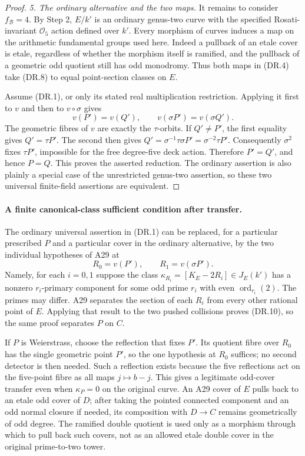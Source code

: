 \documentclass[11pt,a4paper]{article}
\begin{document}
\begin{proof}
\emph{5. The ordinary alternative and the two maps.}
It remains to consider $f_{\mathcal B}=4$.  By Step 2, $E/k'$ is an
ordinary genus-two curve with the specified Rosati-invariant
$\mathcal O_5$ action defined over $k'$.  Every morphism of curves induces a map on
the arithmetic fundamental groups used here.  Indeed a pullback of
an etale cover is etale, regardless of whether the morphism itself is
ramified, and the pullback of a geometric odd quotient still has odd
monodromy.  Thus both maps in (DR.4) take (DR.8) to equal point-section
classes on $E$.

Assume (DR.1), or only its stated real multiplication restriction.
Applying it first to $v$ and then to $v\circ\sigma$
gives
\[
                 v(P')=v(Q'),\qquad
                 v(\sigma P')=v(\sigma Q').
 \tag{DR.10}
\]
The geometric fibres of $v$ are exactly the $\tau$-orbits.  If
$Q'\ne P'$, the first equality gives $Q'=\tau P'$.  The second then
gives $Q'=\sigma^{-1}\tau\sigma P'=\sigma^{-2}\tau P'$.
Consequently $\sigma^2$ fixes $\tau P'$, impossible for the free
degree-five deck action.  Therefore $P'=Q'$, and hence $P=Q$.
This proves the asserted reduction.  The ordinary assertion is also
plainly a special case of the unrestricted genus-two assertion, so
these two universal finite-field assertions are equivalent.
\end{proof}

\paragraph{A finite canonical-class sufficient condition after transfer.}
The ordinary universal assertion in (DR.1) can be replaced, for a
particular prescribed $P$ and a particular cover in the ordinary
alternative, by the two individual hypotheses of A29 at
\[
                 R_0=v(P'),\qquad R_1=v(\sigma P').
 \tag{DR.11}
\]
Namely, for each $i=0,1$ suppose the class
$\kappa_{R_i}=[K_E-2R_i]\in J_E(k')$ has a nonzero $r_i$-primary
component for some odd prime $r_i$ with even
$\operatorname{ord}_{r_i}(2)$.  The primes may differ.  A29 separates
the section of each $R_i$ from every other rational point of $E$.
Applying that result to the two pushed collisions proves (DR.10), so
the same proof separates $P$ on $C$.

If $P$ is Weierstrass, choose the reflection that fixes $P'$.  Its
quotient fibre over $R_0$ has the single geometric point $P'$, so the
one hypothesis at $R_0$ suffices; no second detector is then needed.
Such a reflection exists because the five reflections act on the
five-point fibre as all maps $j\mapsto b-j$.  This gives a legitimate
odd-cover transfer even when $\kappa_P=0$ on the original curve.
An A29 cover of $E$ pulls back to an etale odd cover of $D$; after
taking the pointed connected component and an odd normal closure if
needed, its composition with $D\to C$ remains geometrically of odd
degree.  The ramified double quotient is used only as a morphism
through which to pull back such covers, not as an allowed etale
double cover in the original prime-to-two tower.
\end{document}

